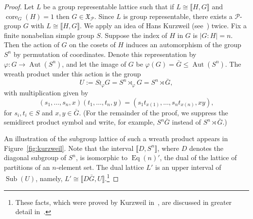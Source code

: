\documentclass{gen-j-l}
\newcommand{\lb}{\ensuremath{\llbracket}}
\newcommand{\rb}{\ensuremath{\rrbracket}}
\newcommand{\<}{\ensuremath{\langle}}
\renewcommand{\>}{\ensuremath{\rangle}}
\theoremstyle{plain}
\theoremstyle{definition}
\theoremstyle{remark}
\numberwithin{theorem}{section}
\numberwithin{claim}{section}
\numberwithin{equation}{section}
\numberwithin{conjecture}{section}
\renewcommand{\leq}{\ensuremath{\leqslant}}
\newcommand{\Aut}{\ensuremath{\operatorname{Aut}}}
\newcommand{\Eq}{\ensuremath{\operatorname{Eq}}}
\newcommand{\Sub}{\ensuremath{\operatorname{Sub}}}
\newcommand{\core}{\ensuremath{\operatorname{core}}}
\newcommand{\2}{\ensuremath{\mathbf{2}}}
\newcommand{\3}{\ensuremath{\mathbf{3}}}
\newcommand{\sG}{\ensuremath{\mathfrak{X}}}
\newcommand{\cP}{\ensuremath{\mathcal{P}}}
\renewcommand{\phi}{\ensuremath{\varphi}}
\begin{document}
\begin{proof}
  Let $L$ be a group representable lattice such that if $L\cong \lb H,G \rb$ and
  $\core_G(H)=1$ then $G\in \sG_\cP$.
  Since $L$ is group representable, there exists a $\cP$-group $G$ with $L
  \cong \lb H,G \rb$. 
  We apply an idea of Hans Kurzweil (see~\cite{Kurzweil:1985}) twice.
Fix a finite nonabelian simple
  group $S$. Suppose the index of $H$ in $G$ is $|G:H| = n$.
  Then the action of $G$ on the cosets of $H$ induces an automorphism of the
  group $S^n$ by permutation of coordinates.  Denote this representation by
  $\phi: G \rightarrow \Aut(S^n)$, 
  and let the image of $G$ be $\phi(G) =
  \bar{G} \leq \Aut(S^n)$.  
  The wreath product under this action is the group
  \[
  U:= S\wr_\phi G = S^n \rtimes_\phi G = S^n \rtimes \bar{G}, %
  \]
  with multiplication given by
  \[
  (s_1, \dots, s_n, x) (t_1, \dots, t_n, y) = 
  (s_1 t_{x(1)}, \dots, s_nt_{x(n)}, x y),
  \]
  for $s_i, t_i \in S$ and $x, y \in \bar{G}$.  (For the remainder of the proof,
  we suppress the semidirect product symbol and write, for example, $S^n\bar{G}$
  instead of $S^n \rtimes \bar{G}$.)

  An illustration of the subgroup lattice of such a wreath product appears in
  Figure~\ref{fig:kurzweil}.  Note that the interval
  $\lb D, S^n \rb$, where $D$ denotes the diagonal subgroup of
  $S^n$, is isomorphic to $\Eq(n)'$, the dual of the lattice of partitions of an
  $n$-element set.
  The dual lattice $L'$ is an upper interval of $\Sub(U)$, namely,
  $L'\cong \lb D\bar{G}, U \rb$.\footnote{These facts, which were proved by Kurzweil
    in~\cite{Kurzweil:1985}, are discussed in greater detail in~\cite[Section 2.2]{DeMeo:thesis}.} 


\end{proof}
\end{document}
